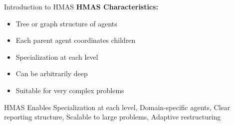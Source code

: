 \documentclass[aspectratio=169,11pt]{beamer}
\begin{document}
\begin{frame}{Introduction to HMAS}
    \vspace{0.3cm}
    \textbf{HMAS Characteristics:}
    \begin{itemize}
        \item Tree or graph structure of agents
        \item Each parent agent coordinates children
        \item Specialization at each level
        \item Can be arbitrarily deep
        \item Suitable for very complex problems
    \end{itemize}

    \begin{block}{HMAS Enables}
        Specialization at each level, Domain-specific agents, Clear reporting structure, Scalable to large problems, Adaptive restructuring
    \end{block}
\end{frame}
\end{document}
